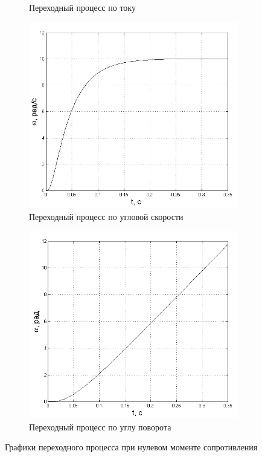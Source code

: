 \documentclass[fleqn, a4paper, 11pt, russian]{article}
\begin{document}
\begin{figure}[ht!]
\begin{subfigure}[b]{0.48\textwidth}
			\caption{Переходный процесс по току}
		\end{subfigure}
		
		\begin{subfigure}[b]{0.48\textwidth}
			\includegraphics[width = \textwidth]{M0omega}
			\caption{Переходный процесс по угловой скорости}
		\end{subfigure}
		\hfill
		\begin{subfigure}[b]{0.48\textwidth}
			\includegraphics[width = \textwidth]{M0alpha}
			\caption{Переходный процесс по углу поворота}
		\end{subfigure}
		\caption{Графики переходного процесса при нулевом моменте сопротивления}
		\label{M0}
	\end{figure}
	\clearpage
\end{document}
